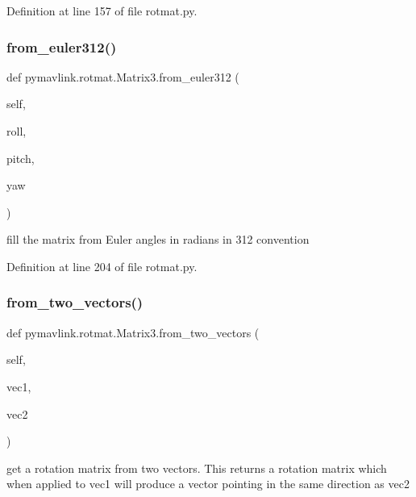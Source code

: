 Definition at line 157 of file rotmat.\+py.

\mbox{\label{classpymavlink_1_1rotmat_1_1Matrix3_a0b834f239462597a080898e9528839a7}} 
\subsubsection{\texorpdfstring{from\_euler312()}{from\_euler312()}}
{\footnotesize\ttfamily def pymavlink.\+rotmat.\+Matrix3.\+from\+\_\+euler312 (\begin{DoxyParamCaption}\item[{}]{self,  }\item[{}]{roll,  }\item[{}]{pitch,  }\item[{}]{yaw }\end{DoxyParamCaption})}

\begin{DoxyVerb}fill the matrix from Euler angles in radians in 312 convention\end{DoxyVerb}
 

Definition at line 204 of file rotmat.\+py.

\mbox{\label{classpymavlink_1_1rotmat_1_1Matrix3_a2c4686d62f2d2bf82c4bbcce63e341f0}} 
\subsubsection{\texorpdfstring{from\_two\_vectors()}{from\_two\_vectors()}}
{\footnotesize\ttfamily def pymavlink.\+rotmat.\+Matrix3.\+from\+\_\+two\+\_\+vectors (\begin{DoxyParamCaption}\item[{}]{self,  }\item[{}]{vec1,  }\item[{}]{vec2 }\end{DoxyParamCaption})}

\begin{DoxyVerb}get a rotation matrix from two vectors.
   This returns a rotation matrix which when applied to vec1
   will produce a vector pointing in the same direction as vec2\end{DoxyVerb}
 

